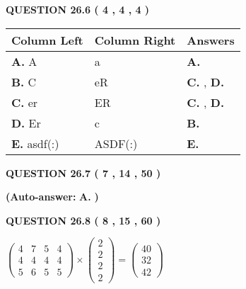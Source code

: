 \documentclass[12pt]{article}
\begin{document}
  
  
{\textbf{\large{QUESTION
26.6 
 (           4 ,           4 ,           4 )
}}}
 
 
\noindent{}
  
  
\begin{tabular}{|l|l|l|}
 \hline
 Column Left & Column Right  & Answers       \\ 
 \hline
{\textbf{\large{
A.}}}
A
  & 
a
 & 
{\textbf{\large{
A.}}}
 \\ 
 \hline
{\textbf{\large{
B.}}}
C
  & 
eR
 & 
{\textbf{\large{
C.}}}
, 
{\textbf{\large{
D.}}}
 \\ 
 \hline
{\textbf{\large{
C.}}}
er
  & 
ER
 & 
{\textbf{\large{
C.}}}
, 
{\textbf{\large{
D.}}}
 \\ 
 \hline
{\textbf{\large{
D.}}}
Er
  & 
c
 & 
{\textbf{\large{
B.}}}
 \\ 
 \hline
{\textbf{\large{
E.}}}
asdf(:)
  & 
ASDF(:)
 & 
{\textbf{\large{
E.}}}
 \\ 
 \hline
 \end{tabular}
  
  
\noindent{}
 
 
  
  
{\textbf{\large{QUESTION
26.7 
 (           7 ,          14 ,          50 )
}}}
 
 
{\textbf{(Auto-answer:}}
{\textbf{\large{
A.}}}
{\textbf{)}}
 
 
  
  
{\textbf{\large{QUESTION
26.8 
 (           8 ,          15 ,          60 )
}}}

 
$\left( \begin{array}{ccccccccccccccc}
           4  & 
           7  & 
           5  & 
           4  \\ 
           4  & 
           4  & 
           4  & 
           4  \\ 
           5  & 
           6  & 
           5  & 
           5
\end{array}\right) \times
\left( \begin{array}{c}
           2  \\ 
           2  \\ 
           2  \\ 
           2
\end{array}\right)  =
\left( \begin{array}{c}
          40  \\ 
          32  \\ 
          42
\end{array}\right)  $
 
\end{document}
